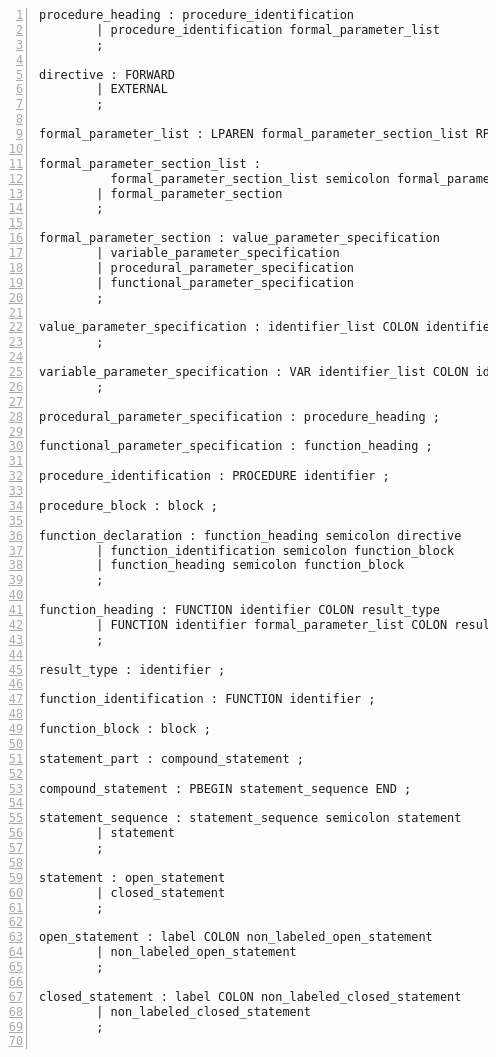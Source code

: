 \begin{Verbatim}[numbers=left]
procedure_heading : procedure_identification
        | procedure_identification formal_parameter_list
        ;

directive : FORWARD
        | EXTERNAL
        ;

formal_parameter_list : LPAREN formal_parameter_section_list RPAREN ;

formal_parameter_section_list : 
          formal_parameter_section_list semicolon formal_parameter_section
        | formal_parameter_section
        ;

formal_parameter_section : value_parameter_specification
        | variable_parameter_specification
        | procedural_parameter_specification
        | functional_parameter_specification
        ;

value_parameter_specification : identifier_list COLON identifier
        ;

variable_parameter_specification : VAR identifier_list COLON identifier
        ;

procedural_parameter_specification : procedure_heading ;

functional_parameter_specification : function_heading ;

procedure_identification : PROCEDURE identifier ;

procedure_block : block ;

function_declaration : function_heading semicolon directive
        | function_identification semicolon function_block
        | function_heading semicolon function_block
        ;

function_heading : FUNCTION identifier COLON result_type
        | FUNCTION identifier formal_parameter_list COLON result_type
        ;

result_type : identifier ;

function_identification : FUNCTION identifier ;

function_block : block ;

statement_part : compound_statement ;

compound_statement : PBEGIN statement_sequence END ;

statement_sequence : statement_sequence semicolon statement
        | statement
        ;

statement : open_statement
        | closed_statement
        ;

open_statement : label COLON non_labeled_open_statement
        | non_labeled_open_statement
        ;

closed_statement : label COLON non_labeled_closed_statement
        | non_labeled_closed_statement
        ;


\end{Verbatim}
